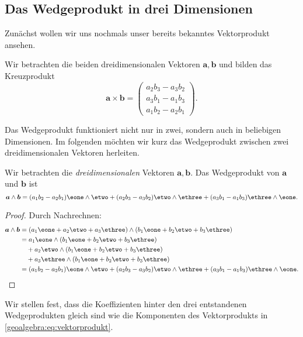 \subsection{Das Wedgeprodukt in drei Dimensionen}
Zunächst wollen wir uns nochmals unser bereits bekanntes
Vektorprodukt ansehen.
%
\begin{definition}
  Wir betrachten die beiden dreidimensionalen Vektoren $\boldsymbol{a}, \boldsymbol{b}$
  und bilden das Kreuzprodukt
  \begin{equation}
    \boldsymbol{a} \times \boldsymbol{b} = \begin{pmatrix} a_2 b_3 - a_3 b_2 \\ a_3 b_1 - a_1 b_3 \\ a_1 b_2 - a_2 b_1 \end{pmatrix}.
    \label{geoalgebra:eq:vektorprodukt}
  \end{equation}
  
\end{definition}

Das Wedgeprodukt funktioniert nicht nur in zwei, sondern auch
in beliebigen Dimensionen. Im folgenden möchten wir kurz
das Wedgeprodukt zwischen zwei dreidimensionalen Vektoren
herleiten.

\begin{lemma}
Wir betrachten die \emph{dreidimensionalen} Vektoren $\boldsymbol{a}, \boldsymbol{b}$.
Das Wedgeprodukt von $\boldsymbol{a}$ und $\boldsymbol{b}$ ist
\begin{equation*}
      \boldsymbol{a} \wedge \boldsymbol{b}
=
      (a_1 b_2 - a_2 b_1) \eone \wedge \etwo 
      + (a_2 b_3 - a_3 b_2) \etwo \wedge \ethree 
      + (a_3 b_1 - a_1 b_3) \ethree \wedge \eone.
\end{equation*}
\label{geoalgebra:eq:wedgeprodukt-dreidimensional}
\end{lemma}
\begin{proof}
Durch Nachrechnen:
\begin{align*}
      \boldsymbol{a} \wedge \boldsymbol{b} &= (a_1 \eone + a_2 \etwo + a_3 \ethree) \wedge (b_1 \eone + b_2 \etwo + b_3 \ethree) \\
      &= a_1 \eone \wedge (b_1 \eone + b_2 \etwo + b_3 \ethree) \\
      &\quad+ a_2 \etwo \wedge (b_1 \eone + b_2 \etwo + b_3 \ethree) \\
      &\quad+ a_3 \ethree \wedge (b_1 \eone + b_2 \etwo + b_3 \ethree) \\
      &= (a_1 b_2 - a_2 b_1) \eone \wedge \etwo 
      + (a_2 b_3 - a_3 b_2) \etwo \wedge \ethree 
      + (a_3 b_1 - a_1 b_3) \ethree \wedge \eone.
\qedhere
\end{align*}
\end{proof}
\noindent Wir stellen fest, dass die Koeffizienten hinter den drei entstandenen Wedgeprodukten
gleich sind wie die Komponenten des Vektorprodukts in \eqref{geoalgebra:eq:vektorprodukt}.

